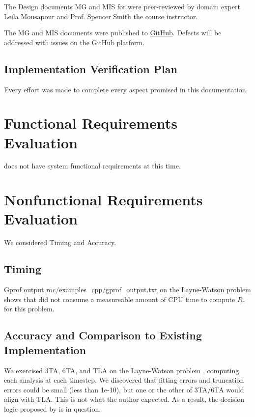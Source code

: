 \documentclass[12pt, titlepage]{article}
\begin{document}
The Design documents MG and MIS for  were peer-reviewed by
domain expert Leila Mousapour and Prof. Spencer Smith the course instructor.

The MG and MIS documents were published to \href{https://github.com/JohnErnsthausen/roc}{GitHub}.
Defects will be addressed with issues on the GitHub platform.

\subsection{Implementation Verification Plan}

Every effort was made to complete every aspect promised in this documentation.

\section{Functional Requirements Evaluation}

 does not have system functional requirements at this time.

\section{Nonfunctional Requirements Evaluation}

We considered Timing and Accuracy.

\subsection{Timing}

Gprof output \href{https://github.com/JohnErnsthausen/roc/blob/master/examples\_cpp/gprof\_output.txt}{roc/examples\_cpp/gprof\_output.txt} on the Layne-Watson problem \citep{watson1979} shows that  did not
consume a measureable amount of CPU time to compute $R_c$ for this problem.
		
\subsection{Accuracy and Comparison to Existing Implementation}	

We exercised 3TA, 6TA, and TLA on the Layne-Watson problem \citep{watson1979}, computing
each analysis at each timestep.
We discovered that fitting errors and truncation errors could be small (less than 1e-10),
but one or the other of 3TA/6TA would align with TLA. This is not what the
author expected. As a result, the decision logic proposed by \cite{chang1982} is in
question.
\end{document}
